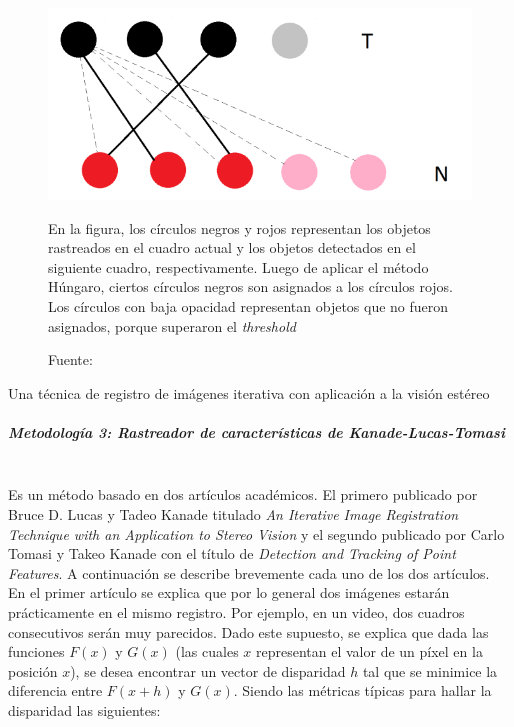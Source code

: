 \documentclass[a4paper,openright,12pt]{report}
\begin{document}
\begin{figure}[H]
  \centering
    \includegraphics[width=1.0\columnwidth]{../images/hungarian-1.png}\par
  \caption{En la figura, los círculos negros y rojos representan los objetos
    rastreados en el cuadro actual y los objetos detectados en el siguiente
    cuadro, respectivamente. Luego de aplicar el método Húngaro, ciertos
    círculos negros son asignados a los círculos rojos. Los círculos con baja
    opacidad representan objetos que no fueron asignados, porque superaron el
    \textit{threshold}}
  \caption*{Fuente: \cite{szHucs2015svm}}
  \label{fig:hungarian-diagram-1}
\end{figure}

Una técnica de registro de imágenes iterativa con
              aplicación a la visión estéreo

\subparagraph{Metodología 3: Rastreador de características de Kanade-Lucas-Tomasi}
\mbox{} \\
Es un método basado en dos artículos académicos. El primero publicado por
Bruce D. Lucas y Tadeo Kanade titulado \textit{An Iterative Image Registration
Technique with an Application to Stereo Vision} \cite{lucas1981iterative} y el
segundo publicado por Carlo Tomasi y Takeo Kanade \cite{tomasi1991detection}
con el título de \textit{Detection and Tracking of Point Features}. A
continuación se describe brevemente cada uno de los dos artículos.\\
En el primer artículo se explica que por
lo general dos imágenes estarán prácticamente en el mismo registro. Por ejemplo,
en un video, dos cuadros consecutivos serán muy parecidos. Dado este supuesto,
se explica que dada las funciones $F(x)$ y $G(x)$ (las cuales $x$ representan
el valor de un píxel en la posición $x$), se desea encontrar un vector de
disparidad $h$ tal que se minimice la diferencia entre $F(x+h)$ y $G(x)$. Siendo
las métricas típicas para hallar la disparidad las siguientes:\\
\end{document}
